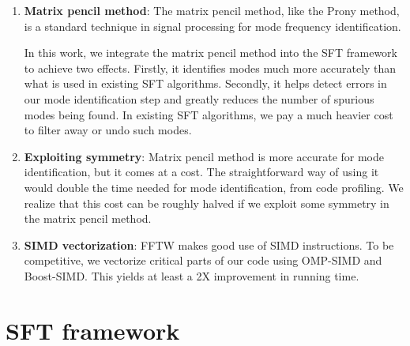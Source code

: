 \documentclass[10pt]{article}
\begin{document}
\begin{enumerate}
\item \textbf{Matrix pencil method}: The matrix pencil method, like the Prony method, is a standard technique in signal processing for mode frequency identification.

In this work, we integrate the matrix pencil method into the SFT framework to achieve two effects. Firstly, it identifies modes much more accurately than what is used in existing SFT algorithms. Secondly, it helps detect errors in our mode identification step and greatly reduces the number of spurious modes being found. In existing SFT algorithms, we pay a much heavier cost to filter away or undo such modes.

\item \textbf{Exploiting symmetry}: Matrix pencil method is more accurate for mode identification, but it comes at a cost. The straightforward way of using it would double the time needed for mode identification, from code profiling. We realize that this cost can be roughly halved if we exploit some symmetry in the matrix pencil method.

\item \textbf{SIMD vectorization}: FFTW makes good use of SIMD instructions. To be competitive, we vectorize critical parts of our code using OMP-SIMD and Boost-SIMD. This yields at least a 2X improvement in running time.

\end{enumerate}

\section{SFT framework}
\end{document}
